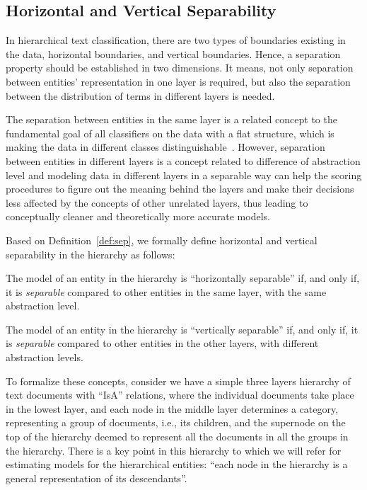 \sshrink
\subsection{Horizontal and Vertical Separability}
\label{subsec:vhs}

In hierarchical text classification, there are two types of boundaries existing in the data, horizontal boundaries, and vertical boundaries. Hence, a separation property should be established in two dimensions. It means, not only separation between entities' representation in one layer is required, but also the separation between the distribution of terms in different layers is needed.

The separation between entities in the same layer is a related concept to the fundamental goal of all classifiers on the data with a flat structure, which is making the data in different classes distinguishable~\citep{Sebastiani:2002}. However, separation between entities in different layers is a concept related to difference of abstraction level and modeling data in different layers in a separable way can help the scoring procedures to figure out the meaning behind the layers and make their decisions less affected by the concepts of other unrelated layers, thus leading to conceptually cleaner and theoretically more accurate models.

Based on Definition~\ref{def:sep}, we formally define horizontal and vertical separability in the hierarchy as follows:
\begin{mydef}
The model of an entity in the hierarchy is ``horizontally separable'' if, and only if, it is \emph{separable} compared to other entities in the same layer, with the same abstraction level.
\end{mydef}

\begin{mydef}
The model of an entity in the hierarchy is ``vertically separable'' if, and only if, it is \emph{separable} compared to other entities in the other layers, with different abstraction levels.
\end{mydef}

To formalize these concepts, consider we have a simple three layers hierarchy of text documents with ``IsA'' relations, where the individual documents take place in the lowest layer, and each node in the middle layer determines a category, representing a group of documents, i.e., its children, and the supernode on the top of the hierarchy deemed to represent all the documents in all the groups in the hierarchy. 
%
There is a key point in this hierarchy to which we will refer for estimating models for the hierarchical entities: ``each node in the hierarchy is a general representation of its descendants''.

